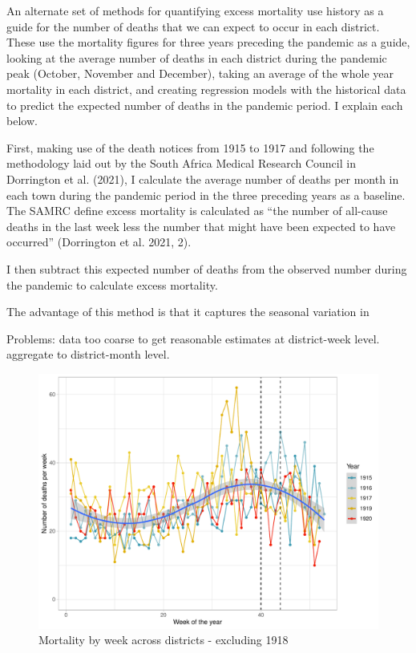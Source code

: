 \documentclass[fleqn,10pt,lineno]{wlpeerj} %
\begin{document}
An alternate set of methods for quantifying excess mortality use history as a guide for the number of deaths that we can expect to occur in each district. These use the mortality figures for three years preceding the pandemic as a guide, looking at the average number of deaths in each district during the pandemic peak (October, November and December), taking an average of the whole year mortality in each district, and creating regression models with the historical data to predict the expected number of deaths in the pandemic period. I explain each below.

First, making use of the death notices from 1915 to 1917 and following the methodology laid out by the South Africa Medical Research Council in Dorrington et al. (2021), I calculate the average number of deaths per month in each town during the pandemic period in the three preceding years as a baseline. The SAMRC define excess mortality is calculated as ``the number of all-cause deaths in the last week less the number that might have been expected to have occurred'' (Dorrington et al. 2021, 2).

I then subtract this expected number of deaths from the observed number during the pandemic to calculate excess mortality.

The advantage of this method is that it captures the seasonal variation in

Problems: data too coarse to get reasonable estimates at district-week level. aggregate to district-month level.

\begin{figure}
\centering
\includegraphics{spanish-flu-mortality_bookdown_files/figure-latex/seasonality-1.pdf}
\caption{\label{fig:seasonality}Mortality by week across districts - excluding 1918}
\end{figure}
\end{document}
